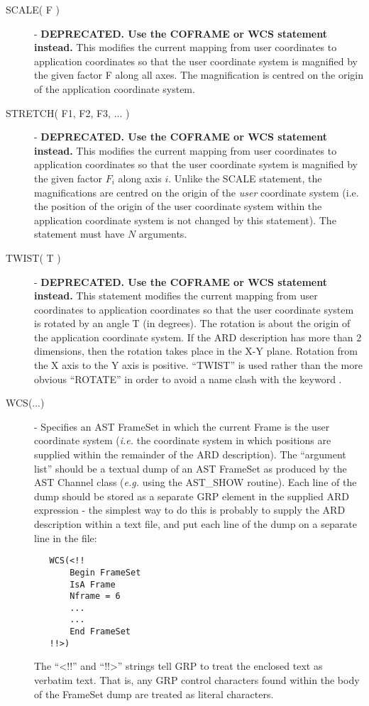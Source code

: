 \begin{description}
\item [\label{ST:SCA}SCALE( F )] - {\bf DEPRECATED. Use the COFRAME or WCS statement instead.} This modifies the current mapping from user coordinates to
application coordinates so that the user coordinate system is magnified by the
given factor F along all axes. The magnification is centred on the origin of the
application coordinate system. 

\item [\label{ST:STR}STRETCH( F1, F2, F3, ... )] - {\bf DEPRECATED. Use the COFRAME or WCS statement instead.} This modifies the current mapping from user
coordinates to application coordinates so that the user coordinate system is
magnified by the given factor $F_{i}$ along axis $i$. Unlike the SCALE
statement, the magnifications are centred on the origin of the {\em user}
coordinate system (i.e. the position of the origin of the user coordinate
system within the application coordinate system is not changed by this
statement). The statement must have $N$ arguments. 

\item [\label{ST:TWI}TWIST( T )] - {\bf DEPRECATED. Use the COFRAME or WCS statement instead.} This statement modifies the current mapping from user
coordinates to application coordinates so that the user coordinate system is
rotated by an angle T (in degrees). The rotation is about the origin of the
application coordinate system. If the ARD description has more than 2
dimensions, then the rotation takes place in the X-Y plane. Rotation from the X
axis to the Y axis is positive. ``TWIST'' is used rather than the more obvious
``ROTATE'' in order to avoid a name clash with the keyword
. 

\item [\label{ST:WCS}WCS(...)] - Specifies an AST FrameSet in which the
current Frame is the user coordinate system ({\em i.e.} the coordinate
system in which positions are supplied within the remainder of the ARD
description). The ``argument list'' should be a textual dump of an AST
FrameSet as produced by the AST Channel class ({\em e.g.} using the
AST\_SHOW routine). Each line of the dump should be stored as a separate
GRP element in the supplied ARD expression - the simplest way to do this
is probably to supply the ARD description within a text file, and put
each line of the dump on a separate line in the file:

\small
\begin{verbatim}
   WCS(<!!
       Begin FrameSet 
       IsA Frame      
       Nframe = 6  
       ...
       ...
       End FrameSet
   !!>)
\end{verbatim}
\normalsize

The ``<!!'' and ``!!>'' strings tell GRP to treat the enclosed text as
verbatim text. That is, any GRP control characters found within the
body of the FrameSet dump are treated as literal characters.

\end{description}


